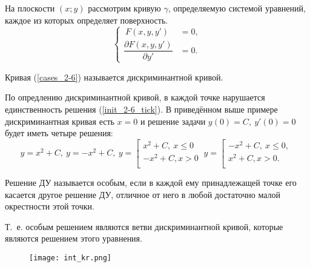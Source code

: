 На плоскости $(x; y)$ рассмотрим кривую $\gamma$, определяемую системой уравнений, каждое из которых определяет поверхность.
\begin{equation}\label{cases_2-6}
	\begin{cases}
		\ F(x, y, y') & = 0, \\
		\dfrac{\partial F(x, y, y')}{\partial y'} & = 0.
	\end{cases}
\end{equation}
\begin{definition}
	Кривая (\ref{cases_2-6}) называется дискриминантной кривой.
\end{definition}
\begin{remark}
	По опредлению дискриминантной кривой, в каждой точке нарушается единственность решения (\ref{init_2-6_tick}). В приведённом выше примере дискриминантная кривая есть $x = 0$ и решение задачи $y(0) = C,\ y'(0) = 0$ будет иметь четыре решения:
	\begin{equation*}
		y = x^2 + C,\ y = -x^2 + C,\ 
		y = 
		\left[ 
			\begin{gathered} 
				x^2 + C,\ x \leq 0\\
				-x^2 + C, x > 0\\ 
			\end{gathered} 
		\right.\
		y = 
		\left[ 
			\begin{gathered} 
				-x^2 + C,\ x \leq 0,\\
				x^2 + C, x > 0.\\ 
			\end{gathered} 
		\right.\
	\end{equation*}
\end{remark}
\begin{definition}
	Решение ДУ называется особым, если в каждой ему принадлежащей точке его касается другое решение ДУ, отличное от него в любой достаточно малой окрестности этой точки.
\end{definition}
\begin{remark}
	Т.\ е. особым решением являются ветви дискриминантной кривой, которые являются решением этого уравнения.
	
	\begin{figure}
	    \centering
	    \texttt{[image: int\_kr.png]}
	\end{figure}
\end{remark}

